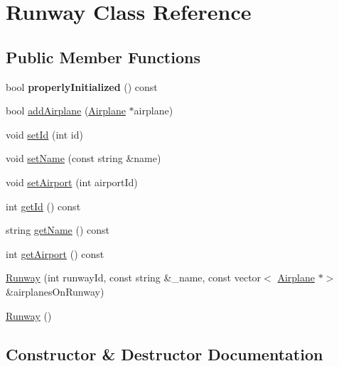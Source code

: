 \hypertarget{class_runway}{}\section{Runway Class Reference}
\label{class_runway}
\subsection*{Public Member Functions}
\begin{DoxyCompactItemize}
\item 
\mbox{\label{class_runway_a360d98246cabf3aa929765f81a656348}} 
bool {\bfseries properly\+Initialized} () const
\item 
bool \mbox{\hyperlink{class_runway_ae07554e4e41faea8ef9654385449b25b}{add\+Airplane}} (\mbox{\hyperlink{class_airplane}{Airplane}} $\ast$airplane)
\item 
void \mbox{\hyperlink{class_runway_af587fc8f841c10a99427cf7a0f442fce}{set\+Id}} (int id)
\item 
void \mbox{\hyperlink{class_runway_ab601d0a69ecffc0042d69cf0eb0cdaba}{set\+Name}} (const string \&name)
\item 
void \mbox{\hyperlink{class_runway_a6614626321a1f4c33f24800cbe78d330}{set\+Airport}} (int airport\+Id)
\item 
int \mbox{\hyperlink{class_runway_afd718b92fbf2bdcbdc5c3da48a76c7af}{get\+Id}} () const
\item 
string \mbox{\hyperlink{class_runway_a525e4c94639bde05c335492d5229f882}{get\+Name}} () const
\item 
int \mbox{\hyperlink{class_runway_ac6d84fd93863115c2b96912b4432d76e}{get\+Airport}} () const
\item 
\mbox{\hyperlink{class_runway_a9907eac3d79e7a4bddd8b00bf1a15bce}{Runway}} (int runway\+Id, const string \&\+\_\+name, const vector$<$ \mbox{\hyperlink{class_airplane}{Airplane}} $\ast$$>$ \&airplanes\+On\+Runway)
\item 
\mbox{\hyperlink{class_runway_a75b9355b4953bd430f7c6ea0a18b465a}{Runway}} ()
\end{DoxyCompactItemize}


\subsection{Constructor \& Destructor Documentation}
\mbox{\label{class_runway_a9907eac3d79e7a4bddd8b00bf1a15bce}} 
